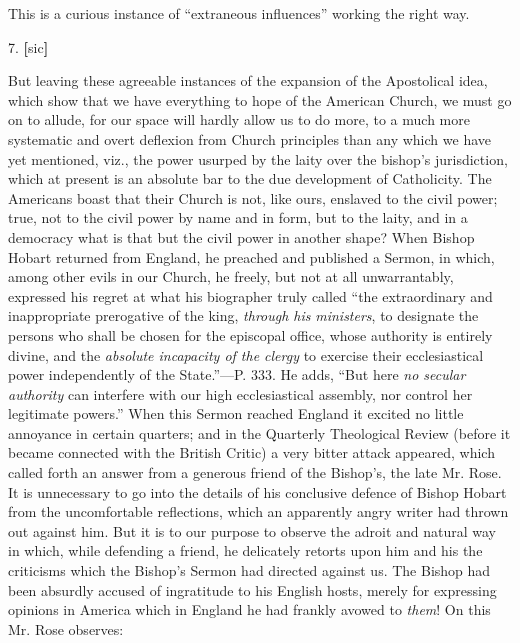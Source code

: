 This is a curious instance of ``extraneous
influences'' working the right way.

7. \textbf{[}sic\textbf{]}

But leaving these agreeable instances of the
expansion of the Apostolical idea, which show that we have everything
to hope of the American Church, we must go on to allude, for our space
will hardly allow us to do more, to a much more systematic and overt
deflexion from Church principles than any which we have yet mentioned,
viz., the power usurped by the laity over the bishop's jurisdiction,
which at present is an absolute bar to the due development of
Catholicity. The Americans boast that their Church is not, like ours,
enslaved to the civil power; true, not to the civil power by name and
in form, but to the laity, and in a democracy what is that but the
civil power in another shape? When Bishop Hobart returned from
England, he preached and published a Sermon, in which, among other
evils in our Church, he freely, but not at all unwarrantably,
expressed his regret at what his biographer truly called ``the
extraordinary and inappropriate prerogative of the king, \emph{through
his} \emph{ministers}, to designate the persons who shall be
chosen for the episcopal office, whose authority is entirely divine,
and the \emph{absolute incapacity of the clergy} to exercise their
ecclesiastical power independently of the State.''—P. 333. He adds, ``But
here \emph{no secular authority} can interfere with our high
ecclesiastical assembly, nor control her legitimate powers.'' When this
Sermon reached England it excited no little annoyance in certain
quarters; and in the Quarterly Theological Review (before it became
connected with the British Critic) a very bitter attack appeared,
which called forth an answer from a generous friend of the Bishop's,
the late Mr. Rose. It is unnecessary to go into the details of his
conclusive defence of Bishop Hobart from the uncomfortable
reflections, which an apparently angry writer had thrown out against
him. But it is to our purpose to observe the adroit and natural way in
which, while defending a friend, he delicately retorts upon him and
his the criticisms which the Bishop's Sermon had directed against us.
The Bishop had been absurdly accused of ingratitude to his English
hosts, merely for expressing opinions in America which in England he
had frankly avowed to \emph{them}! On this Mr. Rose observes:

